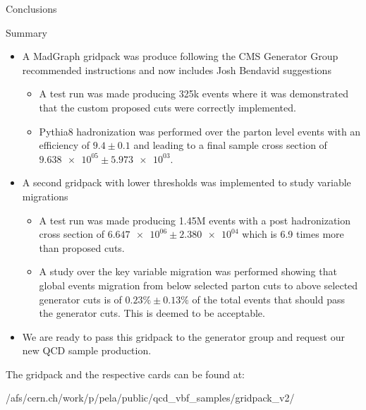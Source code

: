 \documentclass[8pt]{beamer}
\begin{document}
\begin{frame}{Conclusions}

\begin{block}{Summary}
  
\begin{itemize}
  \item A MadGraph gridpack was produce following the CMS Generator Group recommended instructions and now includes Josh Bendavid suggestions
  \begin{itemize}
    \item A test run was made producing 325k events where it was demonstrated that the custom proposed cuts were correctly implemented.
    \item Pythia8 hadronization was performed over the parton level events with an efficiency of $ 9.4 \pm 0.1$ and leading to a final sample cross section of $\num{9.638e+05} \pm \num{5.973e+03}$.
  \end{itemize}
  \item A second gridpack with lower thresholds was implemented to study variable migrations
  \begin{itemize}
    \item A test run was made producing 1.45M events with a post hadronization cross section of $\num{6.647e+06} \pm \num{2.380e+04}$ which is 6.9 times more than proposed cuts.
    \item A study over the key variable migration was performed showing that global events migration from below selected parton cuts to above selected generator cuts is of $0.23\% \pm 0.13\%$ of the total events that should pass the generator cuts. This is deemed to be acceptable.
  \end{itemize}
  \item We are ready to pass this gridpack to the generator group and request our new QCD sample production.
\end{itemize}

The gridpack and the respective cards can be found at:
\begin{center}
/afs/cern.ch/work/p/pela/public/qcd\_vbf\_samples/gridpack\_v2/
\end{center}


\end{block}

\end{frame}
\end{document}
